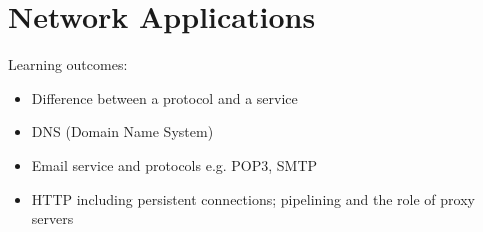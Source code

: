 \documentclass[twoside]{article}
\begin{document}
\section{Network Applications}
Learning outcomes:
\begin{itemize}
    \item Difference between a protocol and a service
    \item DNS (Domain Name System)
    \item Email service and protocols e.g. POP3, SMTP
    \item HTTP including persistent connections; pipelining and the role of 
    proxy servers
\end{itemize}
\end{document}
